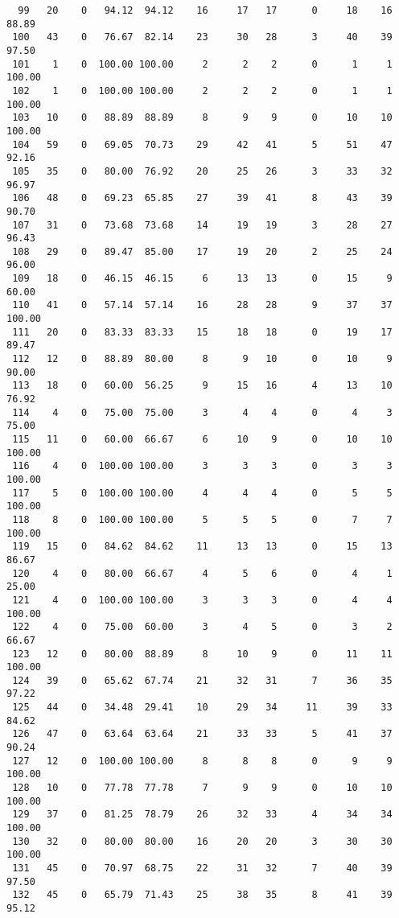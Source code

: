 \begin{verbatim}
  99   20    0   94.12  94.12    16     17   17      0     18    16    88.89
 100   43    0   76.67  82.14    23     30   28      3     40    39    97.50
 101    1    0  100.00 100.00     2      2    2      0      1     1   100.00
 102    1    0  100.00 100.00     2      2    2      0      1     1   100.00
 103   10    0   88.89  88.89     8      9    9      0     10    10   100.00
 104   59    0   69.05  70.73    29     42   41      5     51    47    92.16
 105   35    0   80.00  76.92    20     25   26      3     33    32    96.97
 106   48    0   69.23  65.85    27     39   41      8     43    39    90.70
 107   31    0   73.68  73.68    14     19   19      3     28    27    96.43
 108   29    0   89.47  85.00    17     19   20      2     25    24    96.00
 109   18    0   46.15  46.15     6     13   13      0     15     9    60.00
 110   41    0   57.14  57.14    16     28   28      9     37    37   100.00
 111   20    0   83.33  83.33    15     18   18      0     19    17    89.47
 112   12    0   88.89  80.00     8      9   10      0     10     9    90.00
 113   18    0   60.00  56.25     9     15   16      4     13    10    76.92
 114    4    0   75.00  75.00     3      4    4      0      4     3    75.00
 115   11    0   60.00  66.67     6     10    9      0     10    10   100.00
 116    4    0  100.00 100.00     3      3    3      0      3     3   100.00
 117    5    0  100.00 100.00     4      4    4      0      5     5   100.00
 118    8    0  100.00 100.00     5      5    5      0      7     7   100.00
 119   15    0   84.62  84.62    11     13   13      0     15    13    86.67
 120    4    0   80.00  66.67     4      5    6      0      4     1    25.00
 121    4    0  100.00 100.00     3      3    3      0      4     4   100.00
 122    4    0   75.00  60.00     3      4    5      0      3     2    66.67
 123   12    0   80.00  88.89     8     10    9      0     11    11   100.00
 124   39    0   65.62  67.74    21     32   31      7     36    35    97.22
 125   44    0   34.48  29.41    10     29   34     11     39    33    84.62
 126   47    0   63.64  63.64    21     33   33      5     41    37    90.24
 127   12    0  100.00 100.00     8      8    8      0      9     9   100.00
 128   10    0   77.78  77.78     7      9    9      0     10    10   100.00
 129   37    0   81.25  78.79    26     32   33      4     34    34   100.00
 130   32    0   80.00  80.00    16     20   20      3     30    30   100.00
 131   45    0   70.97  68.75    22     31   32      7     40    39    97.50
 132   45    0   65.79  71.43    25     38   35      8     41    39    95.12

\end{verbatim}
